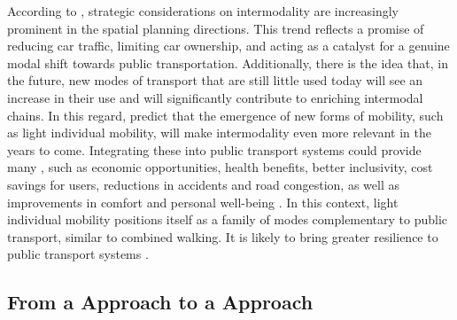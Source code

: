 \begin{refsegment}
According to \textcolor{blue}{\textcite[116]{goletz_intermodality_2020}}, strategic considerations on intermodality are increasingly prominent in the spatial planning directions. This trend reflects a promise of reducing car traffic, limiting car ownership, and acting as a catalyst for a genuine modal shift towards public transportation. Additionally, there is the idea that, in the future, new modes of transport that are still little used today will see an increase in their use and will significantly contribute to enriching intermodal chains. In this regard, \textcolor{blue}{\textcite[77]{oostendorp_combining_2018}} predict that the emergence of new forms of mobility, such as light individual mobility, will make intermodality even more relevant in the years to come. Integrating these  into public transport systems could provide many , such as economic opportunities, health benefits, better inclusivity, cost savings for users, reductions in accidents and road congestion, as well as improvements in comfort and personal well-being \textcolor{blue}{\autocite[39-40]{litman_new_2021}}. In this context, light individual mobility positions itself as a family of modes complementary to public transport, similar to combined walking. It is likely to bring greater resilience to public transport systems \textcolor{blue}{\autocites{heran_velo_2020}[6]{dezobry_du_2020}}.%

\subsection{From a  Approach to a  Approach
    \label{chap1:btod-definition}
    }


\end{refsegment}
